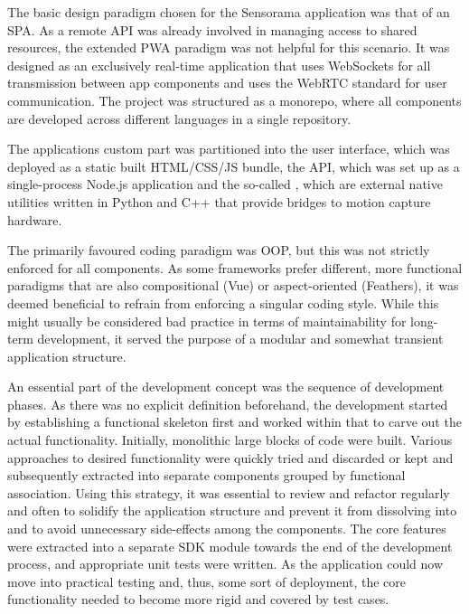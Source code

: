 The basic design paradigm chosen for the Sensorama application was that of an \ac{SPA}.
As a remote API was already involved in managing access to shared resources, the extended \ac{PWA} paradigm was not helpful for this scenario.
It was designed as an exclusively real-time application that uses WebSockets for all transmission between app components and uses the WebRTC standard for user communication.
The project was structured as a monorepo, where all components are developed across different languages in a single repository.

The application\textquotesingle s custom part was partitioned into the user interface, which was deployed as a static built \ac{HTML}/\ac{CSS}/\ac{JS} bundle, the \ac{API}, which was set up as a single-process Node.js application and the so-called , which are external native utilities written in Python and C++ that provide bridges to motion capture hardware.

The primarily favoured coding paradigm was \ac{OOP}, but this was not strictly enforced for all components.
As some frameworks prefer different, more functional paradigms that are also compositional (Vue) or aspect-oriented (Feathers), it was deemed beneficial to refrain from enforcing a singular coding style.
While this might usually be considered bad practice in terms of maintainability for long-term development, it served the purpose of a modular and somewhat transient  application structure.

An essential part of the development concept was the sequence of development phases.
As there was no explicit definition beforehand, the development started by establishing a functional skeleton first and worked within that to carve out the actual functionality.
Initially, monolithic large blocks of code were built.
Various approaches to desired functionality were quickly tried and discarded or kept and subsequently extracted into separate components grouped by functional association.
Using this strategy, it was essential to review and refactor regularly and often to solidify the application structure and prevent it from dissolving into  and to avoid unnecessary side-effects among the components.
The core features were extracted into a separate \ac{SDK} module towards the end of the development process, and appropriate unit tests were written.
As the application could now move into practical testing and, thus, some sort of  deployment, the core functionality needed to become more rigid and covered by test cases.

